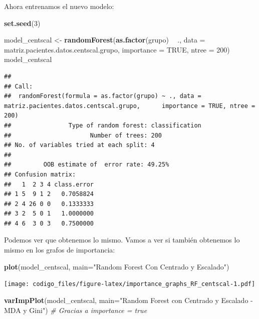 \documentclass[]{article}
\newenvironment{Shaded}{\begin{snugshade}}{\end{snugshade}}
\newcommand{\KeywordTok}[1]{\textcolor[rgb]{0.13,0.29,0.53}{\textbf{#1}}}
\newcommand{\DataTypeTok}[1]{\textcolor[rgb]{0.13,0.29,0.53}{#1}}
\newcommand{\DecValTok}[1]{\textcolor[rgb]{0.00,0.00,0.81}{#1}}
\newcommand{\StringTok}[1]{\textcolor[rgb]{0.31,0.60,0.02}{#1}}
\newcommand{\CommentTok}[1]{\textcolor[rgb]{0.56,0.35,0.01}{\textit{#1}}}
\newcommand{\OtherTok}[1]{\textcolor[rgb]{0.56,0.35,0.01}{#1}}
\newcommand{\OperatorTok}[1]{\textcolor[rgb]{0.81,0.36,0.00}{\textbf{#1}}}
\newcommand{\NormalTok}[1]{#1}
\begin{document}
Ahora entrenamos el nuevo modelo:

\begin{Shaded}
\begin{Highlighting}[]
\KeywordTok{set.seed}\NormalTok{(}\DecValTok{3}\NormalTok{)}

\NormalTok{model_centscal <-}\StringTok{ }\KeywordTok{randomForest}\NormalTok{(}\KeywordTok{as.factor}\NormalTok{(grupo) }\OperatorTok{~}\StringTok{ }\NormalTok{., }\DataTypeTok{data =}\NormalTok{ matriz.pacientes.datos.centscal.grupo, }\DataTypeTok{importance =} \OtherTok{TRUE}\NormalTok{, }\DataTypeTok{ntree =} \DecValTok{200}\NormalTok{)}
\NormalTok{model_centscal}
\end{Highlighting}
\end{Shaded}

\begin{verbatim}
## 
## Call:
##  randomForest(formula = as.factor(grupo) ~ ., data = matriz.pacientes.datos.centscal.grupo,      importance = TRUE, ntree = 200) 
##                Type of random forest: classification
##                      Number of trees: 200
## No. of variables tried at each split: 4
## 
##         OOB estimate of  error rate: 49.25%
## Confusion matrix:
##   1  2 3 4 class.error
## 1 5  9 1 2   0.7058824
## 2 4 26 0 0   0.1333333
## 3 2  5 0 1   1.0000000
## 4 6  3 0 3   0.7500000
\end{verbatim}

Podemos ver que obtenemos lo mismo. Vamos a ver si también obtenemos lo
mismo en los grafos de importancia:

\begin{Shaded}
\begin{Highlighting}[]
\KeywordTok{plot}\NormalTok{(model_centscal, }\DataTypeTok{main=}\StringTok{"Random Forest Con Centrado y Escalado"}\NormalTok{)}
\end{Highlighting}
\end{Shaded}

\texttt{[image: codigo\_files/figure-latex/importance\_graphs\_RF\_centscal-1.pdf]}

\begin{Shaded}
\begin{Highlighting}[]
\KeywordTok{varImpPlot}\NormalTok{(model_centscal, }\DataTypeTok{main=}\StringTok{"Random Forest con Centrado y Escalado - MDA y Gini"}\NormalTok{) }\CommentTok{# Gracias a importance = true}
\end{Highlighting}
\end{Shaded}
\end{document}
